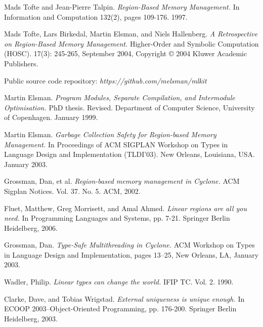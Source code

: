 \documentclass[11pt]{report}
\begin{document}
\begin{thebibliography}{10}
Mads Tofte and Jean-Pierre Talpin. \textit{Region-Based Memory Management.} In Information and Computation 132(2), pages 109-176. 1997.

Mads Tofte, Lars Birkedal, Martin Elsman, and Niels Hallenberg. \textit{A Retrospective on Region-Based Memory Management.} Higher-Order and Symbolic Computation (HOSC). 17(3): 245-265, September 2004, Copyright © 2004 Kluwer Academic Publishers.

Public source code repository: \textit{https://github.com/melsman/mlkit}

Martin Elsman. \textit{Program Modules, Separate Compilation, and Intermodule Optimisation.} PhD thesis. Revised. Department of Computer Science, University of Copenhagen. January 1999.
 
Martin Elsman. \textit{Garbage Collection Safety for Region-based Memory Management.} In Proceedings of ACM SIGPLAN Workshop on Types in Language Design and Implementation (TLDI’03). New Orleans, Louisiana, USA. January 2003.

Grossman, Dan, et al. \textit{Region-based memory management in Cyclone.} ACM Sigplan Notices. Vol. 37. No. 5. ACM, 2002.

Fluet, Matthew, Greg Morrisett, and Amal Ahmed. \textit{Linear regions are all you need.} In Programming Languages and Systems, pp. 7-21. Springer Berlin Heidelberg, 2006.

Grossman, Dan. \textit{Type-Safe Multithreading in Cyclone.} ACM Workshop on Types in Language Design and Implementation, pages 13–25, New Orleans, LA, January 2003.

Wadler, Philip. \textit{Linear types can change the world.} IFIP TC. Vol. 2. 1990.

Clarke, Dave, and Tobias Wrigstad. \textit{External uniqueness is unique enough.} In ECOOP 2003–Object-Oriented Programming, pp. 176-200. Springer Berlin Heidelberg, 2003.

\end{thebibliography}
\end{document}
